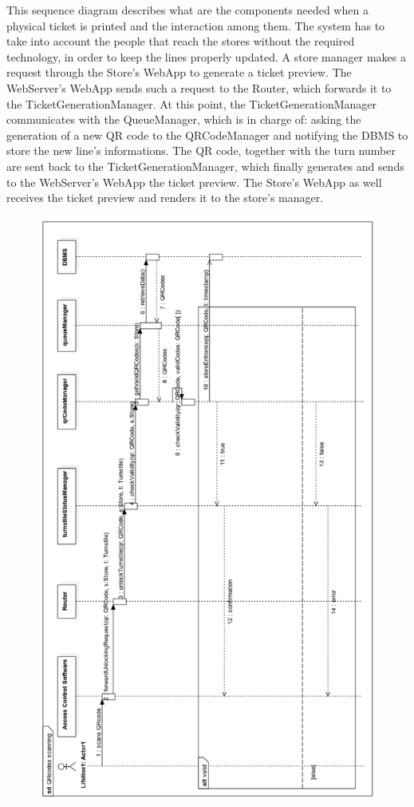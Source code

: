 \documentclass{article}
\begin{document}
\noindent This sequence diagram describes what are the components needed when a physical ticket is printed and the interaction among them. The system has to take into account the people that reach the stores without the required technology, in order to keep the lines properly updated. A store manager makes a request through the Store’s WebApp to generate a ticket preview. The WebServer’s WebApp sends such a request to the Router, which forwards it to the TicketGenerationManager. At this point, the TicketGenerationManager communicates with the QueueManager, which is in charge of: asking the generation of a new QR code to the QRCodeManager and notifying the DBMS to store the new line’s  informations. The QR code, together with the turn number are sent back to the TicketGenerationManager, which finally generates and sends to the WebServer’s WebApp the ticket preview. The Store’s WebApp as well receives the ticket preview and renders it to the store’s manager.
\begin{figure}[H]
  \includegraphics[width=\linewidth]{QrRT.png}
  
\end{figure}
\end{document}
